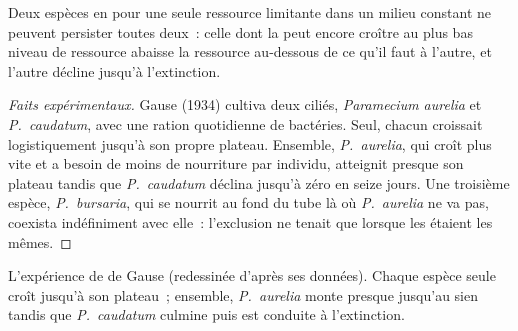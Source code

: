\begin{proposition}\label{prop:b1:species-interactions:gause}
Deux espèces en  pour une seule ressource limitante dans un
milieu constant ne peuvent persister toutes deux~: celle dont la
 peut encore croître au plus bas niveau de ressource abaisse
la ressource au-dessous de ce qu'il faut à l'autre, et l'autre décline
jusqu'à l'extinction.
\end{proposition}
\begin{proof}[Faits expérimentaux]
Gause (1934) cultiva deux ciliés, \emph{Paramecium aurelia} et
\emph{P.~caudatum}, avec une ration quotidienne de bactéries. Seul,
chacun croissait logistiquement jusqu'à son propre plateau. Ensemble,
\emph{P.~aurelia}, qui croît plus vite et a besoin de moins de
nourriture par individu, atteignit presque son plateau tandis que
\emph{P.~caudatum} déclina jusqu'à zéro en seize jours. Une troisième
espèce, \emph{P.~bursaria}, qui se nourrit au fond du tube là où
\emph{P.~aurelia} ne va pas, coexista indéfiniment avec elle~:
l'exclusion ne tenait que lorsque les  étaient les mêmes.
\end{proof}

\begin{omfigure}

{\small L'expérience de  de Gause (redessinée d'après ses
données). Chaque espèce seule croît jusqu'à son plateau~; ensemble,
\emph{P.~aurelia} monte presque jusqu'au sien tandis que
\emph{P.~caudatum} culmine puis est conduite à l'extinction.}
\end{omfigure}

